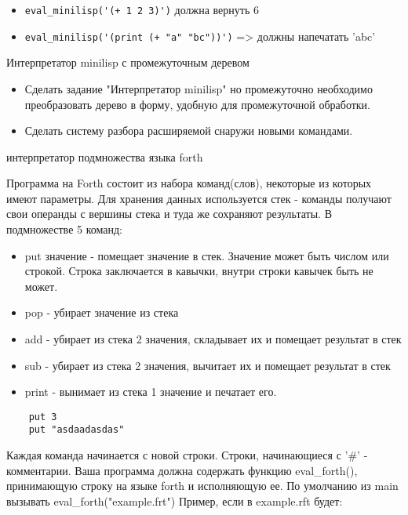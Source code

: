 \documentclass{article}
\begin{document}
\begin{itemize}
    \item \lstinline!eval_minilisp('(+ 1 2 3)')! должна вернуть 6
    \item \lstinline!eval_minilisp('(print (+ "a" "bc"))')! => должны напечатать 'abc'
\end{itemize}
\newpage

\begin{center} Интерпретатор minilisp с промежуточным деревом \end{center}
\begin{itemize}
    \item Сделать задание "Интерпретатор minilisp" но промежуточно необходимо преобразовать
        дерево в форму, удобную для промежуточной обработки. 
    \item Сделать систему разбора расширяемой снаружи новыми командами.
\end{itemize}
\newpage

\begin{center} интерпретатор подмножества языка forth \end{center}
      Программа на Forth состоит из набора команд(слов),
      некоторые из которых имеют параметры. Для хранения данных используется стек -
      команды получают свои операнды с вершины стека и туда же сохраняют результаты.
      В  подмножестве 5 команд:
\begin{itemize}
    \item put значение - помещает значение в стек. Значение может
          быть числом или строкой. Строка заключается в кавычки, внутри
          строки кавычек быть не может.
    \item pop - убирает значение из стека
    \item add - убирает из стека 2 значения, складывает их и помещает результат в стек
    \item sub - убирает из стека 2 значения, вычитает их и помещает результат в стек
    \item print - вынимает из стека 1 значение и печатает его.
\end{itemize}


\begin{lstlisting}
    put 3
    put "asdaadasdas"
\end{lstlisting}

    Каждая команда начинается с новой строки. Строки, начинающиеся с '\#' - комментарии.
    Ваша программа должна содержать функцию eval\_forth(), принимающую строку на языке
    forth и исполняющую ее. По умолчанию из main вызывать eval\_forth("example.frt")
    Пример, если в example.rft будет:
\end{document}
